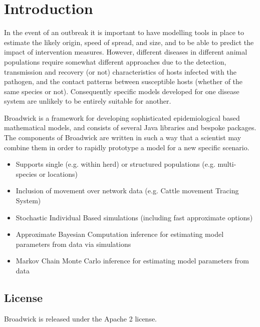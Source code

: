 \chapter{Introduction}

In the event of an outbreak it is important to have modelling tools in place to estimate the likely origin, speed of spread, and size, and to be able to predict the impact of intervention measures.  However, different diseases in different animal populations require somewhat different approaches due to the detection, transmission and recovery (or not) characteristics of hosts infected with the pathogen, and the contact patterns between susceptible hosts (whether of the same species or not).  Consequently specific models developed for one disease system are unlikely to be entirely suitable for another.  

Broadwick is a framework for developing sophisticated epidemiological based mathematical models, and consists of several Java libraries and bespoke packages.  The components of Broadwick are written in such a way that a scientist may combine them in order to rapidly prototype a model for a new specific scenario.

\begin{itemize}
\item Supports single (e.g. within herd) or structured populations (e.g. multi-species or locations)
\item Inclusion of movement over network data (e.g. Cattle movement Tracing System) 
\item Stochastic Individual Based simulations (including fast approximate options) 
\item Approximate Bayesian Computation inference for estimating model parameters from data via simulations
\item Markov Chain Monte Carlo inference for estimating model parameters from data
\end{itemize}

\section{License}

Broadwick is released under the Apache 2 license.

%

